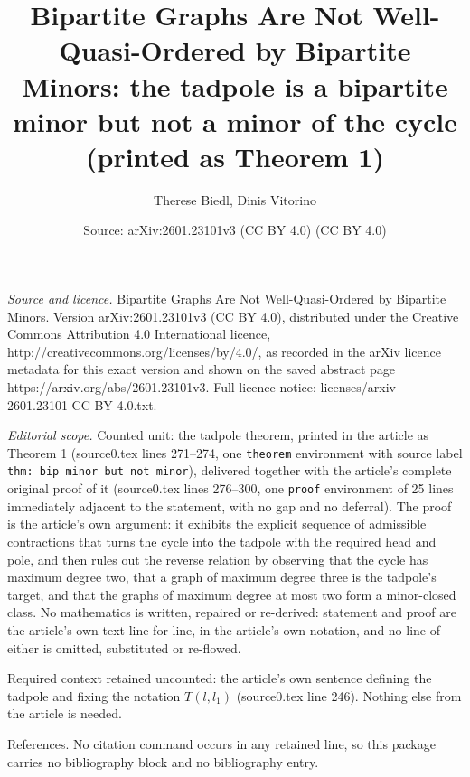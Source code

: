 \documentclass[10pt,a4paper]{amsart}
\title[Bipartite Graphs Are Not Well-Quasi-Ordered by Bipartite Minors]{Bipartite Graphs Are Not Well-Quasi-Ordered by Bipartite Minors: the tadpole is a bipartite minor but not a minor of the cycle (printed as Theorem 1)}
\author{Therese Biedl, Dinis Vitorino}
\date{Source: arXiv:2601.23101v3 (CC BY 4.0) (CC BY 4.0)}
\theoremstyle{plain}
\theoremstyle{definition}
\theoremstyle{remark}
\begin{document}
\maketitle

\noindent\emph{Source and licence.} Bipartite Graphs Are Not Well-Quasi-Ordered by Bipartite Minors. Version arXiv:2601.23101v3 (CC BY 4.0), distributed under the Creative Commons Attribution 4.0 International licence, http://creativecommons.org/licenses/by/4.0/, as recorded in the arXiv licence metadata for this exact version and shown on the saved abstract page https://arxiv.org/abs/2601.23101v3. Full licence notice: licenses/arxiv-2601.23101-CC-BY-4.0.txt.\par\smallskip

\noindent\textit{Editorial scope.} Counted unit: the tadpole theorem, printed in the article as Theorem 1 (source0.tex lines 271--274, one \texttt{theorem} environment with source label \texttt{thm: bip minor but not minor}), delivered together with the article's complete original proof of it (source0.tex lines 276--300, one \texttt{proof} environment of 25 lines immediately adjacent to the statement, with no gap and no deferral). The proof is the article's own argument: it exhibits the explicit sequence of admissible contractions that turns the cycle into the tadpole with the required head and pole, and then rules out the reverse relation by observing that the cycle has maximum degree two, that a graph of maximum degree three is the tadpole's target, and that the graphs of maximum degree at most two form a minor-closed class. No mathematics is written, repaired or re-derived: statement and proof are the article's own text line for line, in the article's own notation, and no line of either is omitted, substituted or re-flowed.

Required context retained uncounted: the article's own sentence defining the tadpole and fixing the notation $T(l,l_1)$ (source0.tex line 246). Nothing else from the article is needed.

References. No citation command occurs in any retained line, so this package carries no bibliography block and no bibliography entry.
\end{document}
